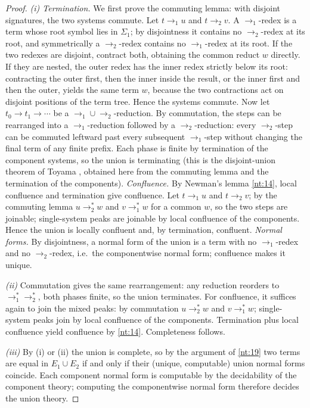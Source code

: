 \begin{proof}
\emph{(i) Termination.} We first prove the commuting lemma: with
disjoint signatures, the two systems commute. Let $t \to_1 u$ and
$t \to_2 v$. A $\to_1$-redex is a term whose root symbol lies in
$\Sigma_1$; by disjointness it contains no $\to_2$-redex at its root,
and symmetrically a $\to_2$-redex contains no $\to_1$-redex at its
root. If the two redexes are disjoint, contract both, obtaining the
common reduct $w$ directly. If they are nested, the outer redex has the
inner redex strictly below its root: contracting the outer first, then
the inner inside the result, or the inner first and then the outer,
yields the same term $w$, because the two contractions act on disjoint
positions of the term tree. Hence the systems commute. Now let $t_0 \to
t_1 \to \cdots$ be a $\to_1 \cup \to_2$-reduction. By commutation, the
steps can be rearranged into a $\to_1$-reduction followed by a
$\to_2$-reduction: every $\to_2$-step can be commuted leftward past
every subsequent $\to_1$-step without changing the final term of any
finite prefix. Each phase is finite by termination of the component
systems, so the union is terminating (this is the disjoint-union
theorem of Toyama \citep{toyama}, obtained here from the commuting
lemma and the termination of the components).
\emph{Confluence.} By Newman's lemma \ref{nt:14}, local confluence and
termination give confluence. Let $t \to_1 u$ and $t \to_2 v$; by the
commuting lemma $u \to_2^* w$ and $v \to_1^* w$ for a common $w$, so the
two steps are joinable; single-system peaks are joinable by local
confluence of the components. Hence the union is locally confluent and,
by termination, confluent.
\emph{Normal forms.} By disjointness, a normal form of the union is a
term with no $\to_1$-redex and no $\to_2$-redex, i.e.\ the componentwise
normal form; confluence makes it unique.

\emph{(ii)} Commutation gives the same rearrangement: any reduction
reorders to $\to_1^* \to_2^*$, both phases finite, so the union
terminates. For confluence, it suffices again to join the mixed peaks:
by commutation $u \to_2^* w$ and $v \to_1^* w$; single-system peaks
join by local confluence of the components. Termination plus local
confluence yield confluence by \ref{nt:14}. Completeness follows.

\emph{(iii)} By (i) or (ii) the union is complete, so by the argument
of \ref{nt:19} two terms are equal in $E_1 \cup E_2$ if and only if
their (unique, computable) union normal forms coincide. Each component
normal form is computable by the decidability of the component theory;
computing the componentwise normal form therefore decides the union
theory.
\end{proof}

